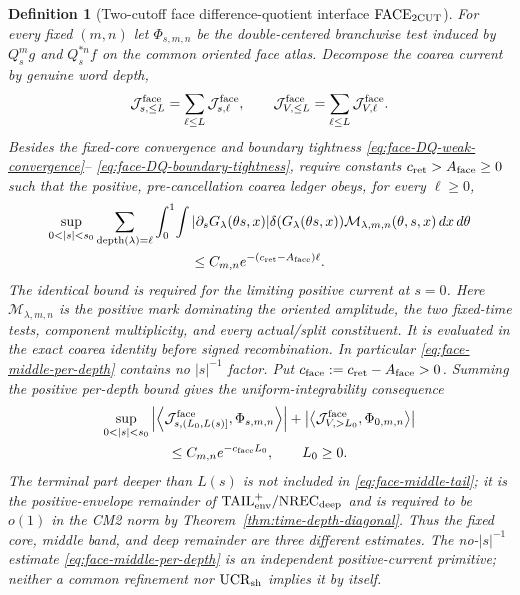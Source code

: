 \documentclass[11pt]{article}
\newtheorem{definition}[theorem]{Definition}
\begin{document}
\begin{definition}[Two-cutoff face difference-quotient interface
$\mathrm{FACE}_{\rm 2CUT}$]
\label{def:face-two-cutoff}
For every fixed $(m,n)$ let $\Phi_{s,m,n}$ be the double-centered
branchwise test induced by $Q_s^mg$ and $Q_s^{*n}f$ on the common oriented
face atlas.  Decompose the coarea current by genuine word depth,
\[
 \mathcal J_{s,\le L}^{\rm face}
   =\sum_{\ell\le L}\mathcal J_{s,\ell}^{\rm face},
 \qquad
 \mathcal J_{V,\le L}^{\rm face}
   =\sum_{\ell\le L}\mathcal J_{V,\ell}^{\rm face}.
\]
Besides the fixed-core convergence and boundary tightness
\eqref{eq:face-DQ-weak-convergence}--
\eqref{eq:face-DQ-boundary-tightness}, require constants
$c_{\rm ret}>A_{\rm face}\ge0$ such that the positive, pre-cancellation
coarea ledger obeys, for every $\ell\ge0$,
\begin{multline}
\label{eq:face-middle-per-depth}
 \sup_{0<|s|<s_0}
 \sum_{\operatorname{depth}(\lambda)=\ell}
 \int_0^1\!\int
 |\partial_sG_\lambda(\theta s,x)|
 \delta(G_\lambda(\theta s,x))
 \mathcal M_{\lambda,m,n}(\theta,s,x)\,dx\,d\theta\\
 \le C_{m,n}e^{-(c_{\rm ret}-A_{\rm face})\ell}.
\end{multline}
The identical bound is required for the limiting positive current at $s=0$.
Here $\mathcal M_{\lambda,m,n}$ is the positive mark dominating the oriented
amplitude, the two fixed-time tests, component multiplicity, and every
actual/split constituent.  It is evaluated in the exact coarea identity
before signed recombination.  In particular
\eqref{eq:face-middle-per-depth} contains no $|s|^{-1}$ factor.  Put
$c_{\rm face}:=c_{\rm ret}-A_{\rm face}>0$.  Summing the positive
per-depth bound gives the uniform-integrability consequence
\begin{multline}
\label{eq:face-middle-tail}
 \sup_{0<|s|<s_0}
 \left|\left\langle
 \mathcal J_{s,(L_0,L(s)]}^{\rm face},\Phi_{s,m,n}
 \right\rangle\right|
 +\left|\left\langle
 \mathcal J_{V,>L_0}^{\rm face},\Phi_{0,m,n}
 \right\rangle\right|\\
 \le C_{m,n}e^{-c_{\rm face}L_0},\qquad L_0\ge0.
\end{multline}
The terminal part deeper than $L(s)$ is not included in
\eqref{eq:face-middle-tail}; it is the positive-envelope remainder of
$\mathrm{TAIL}_{\rm env}^{+}/\mathrm{NREC}_{\rm deep}$ and is required to
be $o(1)$ in the CM2 norm by
Theorem~\ref{thm:time-depth-diagonal}.  Thus the fixed core, middle band, and
deep remainder are three different estimates.  The no-$|s|^{-1}$ estimate
\eqref{eq:face-middle-per-depth} is an independent positive-current
primitive; neither a common refinement nor $\mathrm{UCR}_{\rm sh}$ implies
it by itself.
\end{definition}
\end{document}
